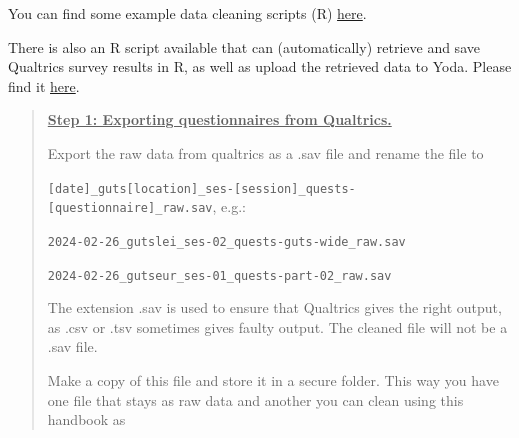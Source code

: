 \documentclass[
  letterpaper,
  DIV=11,
  numbers=noendperiod]{scrreprt}
\begin{document}
\begin{tcolorbox}[enhanced jigsaw, arc=.35mm, left=2mm, colbacktitle=quarto-callout-caution-color!10!white, bottomtitle=1mm, toptitle=1mm, titlerule=0mm, leftrule=.75mm, breakable, colframe=quarto-callout-caution-color-frame, colback=white, opacitybacktitle=0.6, coltitle=black, opacityback=0, rightrule=.15mm, toprule=.15mm, bottomrule=.15mm, title=\textcolor{quarto-callout-caution-color}{\faFire}\hspace{0.5em}{Participant id columns have to be named ``participant\_id'' according to
BIDS standards}]

\end{tcolorbox}

\begin{tcolorbox}[enhanced jigsaw, arc=.35mm, left=2mm, colbacktitle=quarto-callout-note-color!10!white, bottomtitle=1mm, toptitle=1mm, titlerule=0mm, leftrule=.75mm, breakable, colframe=quarto-callout-note-color-frame, colback=white, opacitybacktitle=0.6, coltitle=black, opacityback=0, rightrule=.15mm, toprule=.15mm, bottomrule=.15mm, title=\textcolor{quarto-callout-note-color}{\faInfo}\hspace{0.5em}{Questionnaire data}]

You can find some example data cleaning scripts (R)
\href{data-cleaning-code.zip}{here}.

There is also an R script available that can (automatically) retrieve
and save Qualtrics survey results in R, as well as upload the retrieved
data to Yoda. Please find it
\href{https://github.com/eduardklap/qualtrics-automation}{here}.

\begin{quote}
\textbf{\ul{Step 1: Exporting questionnaires from Qualtrics.}}

Export the raw data from qualtrics as a .sav file and rename the file to

\texttt{{[}date{]}\_guts{[}location{]}\_ses-{[}session{]}\_quests-{[}questionnaire{]}\_raw.sav},
e.g.:

\texttt{2024-02-26\_gutslei\_ses-02\_quests-guts-wide\_raw.sav}

\texttt{2024-02-26\_gutseur\_ses-01\_quests-part-02\_raw.sav}

The extension .sav is used to ensure that Qualtrics gives the right
output, as .csv or .tsv sometimes gives faulty output. The cleaned file
will not be a .sav file.

Make a copy of this file and store it in a secure folder. This way you
have one file that stays as raw data and another you can clean using
this handbook as
\end{quote}


\end{tcolorbox}
\end{document}
